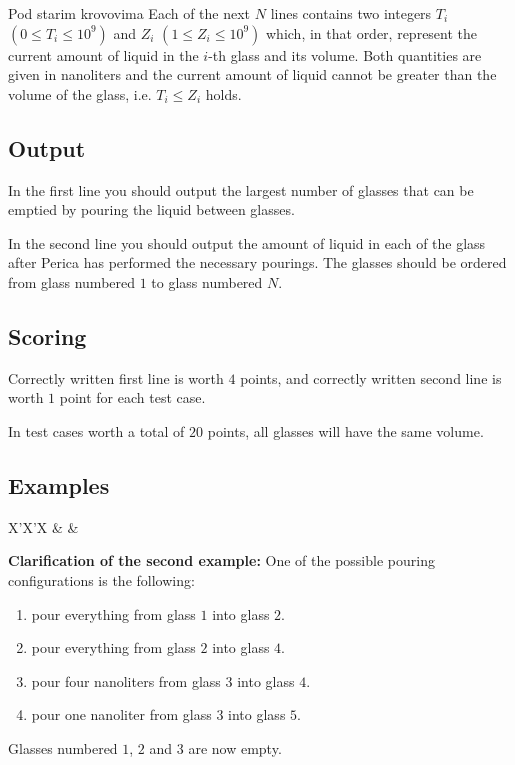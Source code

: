 \begin{statement}[
  problempoints=50,
  timelimit=1 second,
  memorylimit=512 MiB,
]{Pod starim krovovima}
Each of the next $N$ lines contains two integers $T_i$ $(0 \le T_i \le 10^9)$
and $Z_i$ $(1 \le Z_i \le 10^9)$ which, in that order, represent the current
amount of liquid in the $i$-th glass and its volume. Both quantities are
given in nanoliters and the current amount of liquid cannot be greater than
the volume of the glass, i.e.  $T_i \le Z_i$ holds.

\subsection*{Output}
In the first line you should output the largest number of glasses that
can be emptied by pouring the liquid between glasses.

In the second line you should output the amount of liquid in each of the
glass after Perica has performed the necessary pourings. The glasses should
be ordered from glass numbered $1$ to glass numbered $N$.

\subsection*{Scoring}
Correctly written first line is worth $4$ points, and correctly written second
line is worth $1$ point for each test case.

In test cases worth a total of $20$ points, all glasses will have the same
volume.

\subsection*{Examples}
\begin{tabularx}{\textwidth}{X'X'X}
 &
 &
\end{tabularx}

\textbf{Clarification of the second example:}
One of the possible pouring configurations is the following:
\begin{enumerate}
  \item pour everything from glass $1$ into glass $2$.
  \item pour everything from glass $2$ into glass $4$.
  \item pour four nanoliters from glass $3$ into glass $4$.
  \item pour one nanoliter from glass $3$ into glass $5$.
\end{enumerate}
Glasses numbered $1$, $2$ and $3$ are now empty.

\end{statement}

